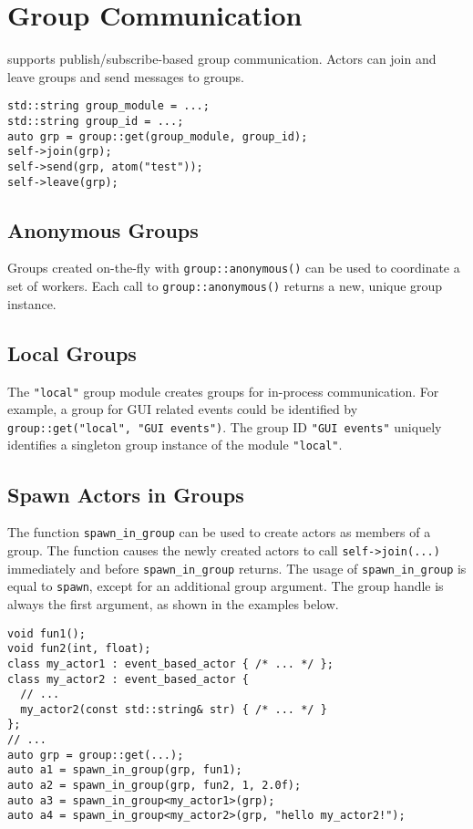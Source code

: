 \section{Group Communication}
\label{Sec::Group}

\ba supports publish/subscribe-based group communication.
Actors can join and leave groups and send messages to groups.

\begin{lstlisting}
std::string group_module = ...;
std::string group_id = ...;
auto grp = group::get(group_module, group_id);
self->join(grp);
self->send(grp, atom("test"));
self->leave(grp);
\end{lstlisting}

\subsection{Anonymous Groups}
\label{Sec::Group::Anonymous}

Groups created on-the-fly with \lstinline^group::anonymous()^ can be used to coordinate a set of workers.
Each call to \lstinline^group::anonymous()^ returns a new, unique group instance.

\subsection{Local Groups}
\label{Sec::Group::Local}

The \lstinline^"local"^ group module creates groups for in-process communication.
For example, a group for GUI related events could be identified by \lstinline^group::get("local", "GUI events")^.
The group ID \lstinline^"GUI events"^ uniquely identifies a singleton group instance of the module \lstinline^"local"^.

\subsection{Spawn Actors in Groups}
\label{Sec::Group::Spawn}

The function \lstinline^spawn_in_group^ can be used to create actors as members of a group.
The function causes the newly created actors to call \lstinline^self->join(...)^ immediately and before \lstinline^spawn_in_group^ returns. 
The usage of \lstinline^spawn_in_group^ is equal to \lstinline^spawn^, except for an additional group argument.
The group handle is always the first argument, as shown in the examples below.

\begin{lstlisting}
void fun1();
void fun2(int, float);
class my_actor1 : event_based_actor { /* ... */ };
class my_actor2 : event_based_actor {
  // ...
  my_actor2(const std::string& str) { /* ... */ }
};
// ...
auto grp = group::get(...);
auto a1 = spawn_in_group(grp, fun1);
auto a2 = spawn_in_group(grp, fun2, 1, 2.0f);
auto a3 = spawn_in_group<my_actor1>(grp);
auto a4 = spawn_in_group<my_actor2>(grp, "hello my_actor2!");
\end{lstlisting}
